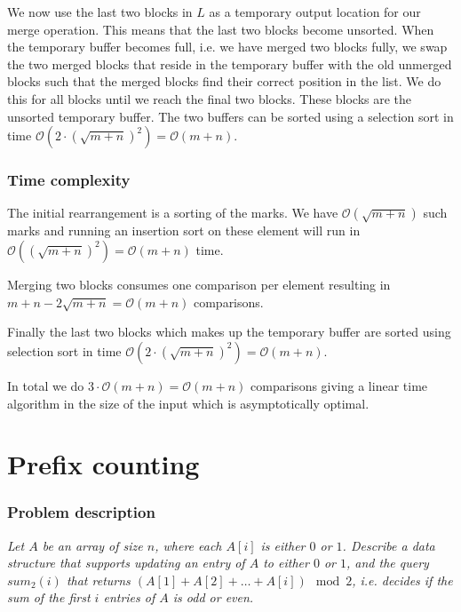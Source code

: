 \documentclass[a4paper,oneside,article,11pt]{memoir}
\begin{document}
We now use the last two blocks in $L$ as a temporary output location for our merge operation. This means that the last two blocks become unsorted. When the temporary buffer becomes full, i.e. we have merged two blocks fully, we swap the two merged blocks that reside in the temporary buffer with the old unmerged blocks such that the merged blocks find their correct position in the list. We do this for all blocks until we reach the final two blocks. These blocks are the unsorted temporary buffer. The two buffers can be sorted using a selection sort in time $\mathcal{O}(2\cdot\left(\sqrt{m+n}\right)^2) = \mathcal{O}(m+n)$.

\subsection{Time complexity}
The initial rearrangement is a sorting of the marks. We have $\mathcal{O}(\sqrt{m+n})$ such marks and running an insertion sort on these element will run in $\mathcal{O}( (\sqrt{m+n})^2) = \mathcal{O}(m+n)$ time.

Merging two blocks consumes one comparison per element resulting in $m+n - 2\sqrt{m+n} = \mathcal{O}(m+n)$ comparisons.

Finally the last two blocks which makes up the temporary buffer are sorted using selection sort in time $\mathcal{O}(2\cdot\left(\sqrt{m+n}\right)^2) = \mathcal{O}(m+n)$.

In total we do $3\cdot\mathcal{O}(m+n) = \mathcal{O}(m+n)$ comparisons giving a linear time algorithm in the size of the input which is asymptotically optimal.


\chapter{Prefix counting}
\label{chp:prefix}
\subsection{Problem description}
\textit{Let $A$ be an array of size $n$, where each $A\left[i\right]$ is either $0$ or $1$. Describe a data structure that supports updating an entry of $A$ to either $0$ or $1$, and the query $sum_2\left(i\right)$ that returns $\left(A\left[1\right]+A\left[2\right]+\dots+A\left[i\right]\right)\mod 2$, i.e. decides if the sum of the first $i$ entries of $A$ is odd or even.}
\end{document}
